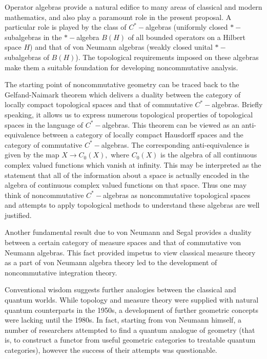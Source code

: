\documentclass[12pt]{article}
\begin{document}
Operator algebras provide a natural edifice to many areas of classical and modern mathematics, and also play a paramount role in the present proposal. 
A particular role is played by the class of $C^{\ast}-$algebras (uniformly closed $\ast-$subalgebras in the $\ast-$algebra $B(H)$ of all bounded operators on a Hilbert space $H$) and that of von Neumann algebras (weakly closed unital $\ast-$subalgebras of $B(H)$). The topological requirements imposed on these algebras make them a suitable foundation for developing noncommutative analysis. 

The starting point of noncommutative geometry can be traced back to the Gelfand-Naimark theorem which delivers a duality between the category of locally compact topological spaces and that of commutative $C^{\ast}-$algebras. Briefly speaking, it allows us to express numerous topological properties of topological spaces in the language of $C^{\ast}-$algebras. This theorem can be viewed as an anti-equivalence between a category of locally compact Hausdorff spaces and the category of commutative $C^{\ast}-$algebras. The corresponding anti-equivalence is given by the map $X\to C_0(X),$ where $C_0(X)$ is the algebra of all continuous complex valued functions which vanish at infinity. This may be interpreted as the statement that all of the information about a space is actually encoded in the algebra of continuous complex valued functions on that space. Thus one may think of noncommutative $C^{\ast}-$algebras as noncommutative topological spaces and attempts to apply topological methods to understand these algebras are well justified. 

Another fundamental result due to von Neumann and Segal provides a duality between a certain category of measure spaces and that of commutative von Neumann algebras. This fact provided impetus to view classical measure theory as a part of von Neumann algebra theory led to the development of noncommutative integration theory.

Conventional wisdom suggests further analogies between the classical and quantum worlds. While topology and measure theory were supplied with natural quantum counterparts in the 1950s, a development of further geometric concepts were lacking until the 1980s. In fact, starting from von Neumann himself, a number of researchers attempted to find a quantum analogue of geometry (that is, to construct a functor from useful geometric categories to treatable quantum categories), however the success of their attempts was questionable.
\end{document}
